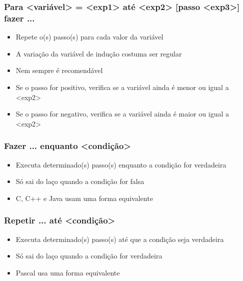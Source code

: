 \documentclass[xcolor={dvipsnames,table},aspectratio=169]{beamer}
\begin{document}
\begin{frame}[fragile]\frametitle{Para <variável> = <exp1> até <exp2> [passo <exp3>] fazer ...}
\begin{itemize}
	\item Repete o(s) passo(s) para cada valor da variável
	\item A variação da variável de indução costuma ser regular
	\item Nem sempre é recomendável
	\item Se o passo for positivo, verifica se a variável ainda é menor ou igual a <exp2>
	\item Se o passo for negativo, verifica se a variável ainda é maior ou igual a <exp2>
\end{itemize}
\end{frame}

\begin{frame}[fragile]\frametitle{Fazer ... enquanto <condição>}
\begin{itemize}
	\item Executa determinado(s) passo(s) enquanto a condição for verdadeira
	\item Só sai do laço quando a condição for falsa
	\item C, C++ e Java usam uma forma equivalente
\end{itemize}
\end{frame}

\begin{frame}[fragile]\frametitle{Repetir ... até <condição>}
\begin{itemize}
	\item Executa determinado(s) passo(s) até que a condição seja verdadeira
	\item Só sai do laço quando a condição for verdadeira
	\item Pascal usa uma forma equivalente
\end{itemize}
\end{frame}
\end{document}

